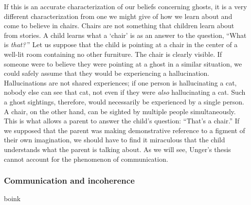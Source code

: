 \documentclass[11pt]{article}
\begin{document}
\begin{spacing}{1.5}
If this is an accurate characterization of our beliefs concerning ghosts, it is a very different characterization from one we might give of how we learn about and come to believe in chairs. Chairs are not something that children learn about from stories. A child learns what a `chair' is as an answer to the question, ``What is {\em that?}\,'' Let us suppose that the child is pointing at a chair in the center of a well-lit room containing no other furniture. The chair is clearly visible. If someone were to believe they were pointing at a ghost in a similar situation, we could safely assume that they would be experiencing a hallucination. Hallucinations are not shared experiences; if one person is hallucinating a cat, nobody else can see that cat, not even if they were {\em also} hallucinating a cat. Such a ghost sightings, therefore, would necessarily be experienced by a single person. A chair, on the other hand, can be sighted by multiple people simultaneously. This is what allows a parent to answer the child's question: ``That's a chair.'' If we supposed that the parent was making demonstrative reference to a figment of their own imagination, we should have to find it miraculous that the child understands what the parent is talking about. As we will see, Unger's thesis cannot account for the phenomenon of communication.

\subsubsection{Communication and incoherence}
\label{unger-comm}
boink

\ifstandalone
\end{spacing}


\fi
\end{document}
